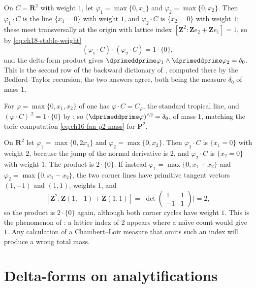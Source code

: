 \begin{example}
\label{ex:ch18-two-dim-product}
On $C=\mathbf R^2$ with weight $1$, let $\varphi_1=\max\{0,x_1\}$ and
$\varphi_2=\max\{0,x_2\}$.  Then $\varphi_1\cdot C$ is the line
$\{x_1=0\}$ with weight $1$, and $\varphi_2\cdot C$ is $\{x_2=0\}$ with
weight $1$; these meet transversally at the origin with lattice index
$[\mathbf Z^2:\mathbf Ze_2+\mathbf Ze_1]=1$, so by
\eqref{eq:ch18-stable-weight}
\[
 (\varphi_1\cdot C)\cdot(\varphi_2\cdot C)=1\cdot\{0\},
\]
and the delta-form product gives
$\dprimeddprime\varphi_1\wedge\dprimeddprime\varphi_2=\delta_0$.  This is
the second row of the backward dictionary of ,
computed there by the Bedford--Taylor recursion; the two answers agree, both
being the measure $\delta_0$ of mass $1$.

For $\varphi=\max\{0,x_1,x_2\}$ of  one has
$\varphi\cdot C=C_\varphi$, the standard tropical line, and
$(\varphi\cdot C)^{\cdot2}=1\cdot\{0\}$ by
; so
$(\dprimeddprime\varphi)^{\wedge2}=\delta_0$, of mass $1$, matching the toric
computation \eqref{eq:ch16-fan-p2-mass} for $\mathbf P^2$.
\end{example}

\begin{example}
\label{ex:ch18-nonunimodular}
On $\mathbf R^2$ let $\varphi_1=\max\{0,2x_1\}$ and
$\varphi_2=\max\{0,x_2\}$.  Then $\varphi_1\cdot C$ is $\{x_1=0\}$ with
weight $2$, because the jump of the normal derivative is $2$, and
$\varphi_2\cdot C$ is $\{x_2=0\}$ with weight $1$.  The product is
$2\cdot\{0\}$.  If instead $\varphi_1=\max\{0,x_1+x_2\}$ and
$\varphi_2=\max\{0,x_1-x_2\}$, the two corner lines have primitive tangent
vectors $(1,-1)$ and $(1,1)$, weights $1$, and
\[
 [\mathbf Z^2:\mathbf Z(1,-1)+\mathbf Z(1,1)]
 =\bigl|\det\begin{pmatrix}1&1\\-1&1\end{pmatrix}\bigr|=2 ,
\]
so the product is $2\cdot\{0\}$ again, although both corner cycles have
weight $1$.  This is the phenomenon of
: a lattice index of $2$ appears where a
na\"\i ve count would give $1$.  Any calculation of a Chambert--Loir measure
that omits such an index will produce a wrong total mass.
\end{example}

\section{Delta-forms on analytifications}
\label{sec:ch18-delta-analytic}

